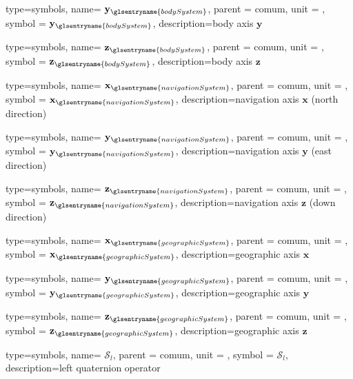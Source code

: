 {type=symbols,
  name= \ensuremath{\mathbf{y}_{\glsentryname{bodySystem}}},
  parent = {comum},
  unit = \unexpanded{},
  symbol = \ensuremath{\mathbf{y}_{\glsentryname{bodySystem}}},
  description={body axis $\mathbf{y}$}
}

{type=symbols,
  name= \ensuremath{\mathbf{z}_{\glsentryname{bodySystem}}},
  parent = {comum},
  unit = \unexpanded{},
  symbol = \ensuremath{\mathbf{z}_{\glsentryname{bodySystem}}},
  description={body axis $\mathbf{z}$}
}



{type=symbols,
  name= \ensuremath{\mathbf{x}_{\glsentryname{navigationSystem}}},
  parent = {comum},
  unit = \unexpanded{},
  symbol = \ensuremath{\mathbf{x}_{\glsentryname{navigationSystem}}},
  description={navigation axis $\mathbf{x}$ (north direction)}
}

{type=symbols,
  name= \ensuremath{\mathbf{y}_{\glsentryname{navigationSystem}}},
  parent = {comum},
  unit = \unexpanded{},
  symbol = \ensuremath{\mathbf{y}_{\glsentryname{navigationSystem}}},
  description={navigation axis $\mathbf{y}$ (east direction)}
}

{type=symbols,
  name= \ensuremath{\mathbf{z}_{\glsentryname{navigationSystem}}},
  parent = {comum},
  unit = \unexpanded{},
  symbol = \ensuremath{\mathbf{z}_{\glsentryname{navigationSystem}}},
  description={navigation axis $\mathbf{z}$ (down direction)}
}

{type=symbols,
  name= \ensuremath{\mathbf{x}_{\glsentryname{geographicSystem}}},
  parent = {comum},
  unit = \unexpanded{},
  symbol = \ensuremath{\mathbf{x}_{\glsentryname{geographicSystem}}},
  description={geographic axis $\mathbf{x}$}
}

{type=symbols,
  name= \ensuremath{\mathbf{y}_{\glsentryname{geographicSystem}}},
  parent = {comum},
  unit = \unexpanded{},
  symbol = \ensuremath{\mathbf{y}_{\glsentryname{geographicSystem}}},
  description={geographic axis $\mathbf{y}$}
}

{type=symbols,
  name= \ensuremath{\mathbf{z}_{\glsentryname{geographicSystem}}},
  parent = {comum},
  unit = \unexpanded{},
  symbol = \ensuremath{\mathbf{z}_{\glsentryname{geographicSystem}}},
  description={geographic axis $\mathbf{z}$}
}


{type=symbols,
  name= \ensuremath{\boldsymbol{\mathcal{S}}_{l}},
  parent = {comum},
  unit = \unexpanded{},
  symbol = \ensuremath{\boldsymbol{\mathcal{S}}_{l}},
  description={left quaternion operator}
}

